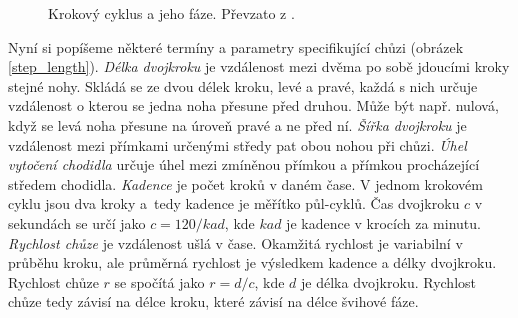 \begin{figure}[h]
\begin{center}
\caption{Krokový cyklus a jeho fáze. Převzato z \cite{gait_img}.} \label{gait_cycle}
\end{center}
\end{figure}

Nyní si popíšeme některé termíny a parametry specifikující chůzi (obrázek \ref{step_length}). \textit{Délka dvojkroku} je vzdálenost mezi dvěma po sobě jdoucími kroky stejné nohy. Skládá se ze dvou délek kroku, levé a pravé, každá s nich určuje vzdálenost o kterou se jedna noha přesune před druhou. Může být např. nulová, když se levá noha přesune na úroveň pravé a ne před ní. \textit{Šířka dvojkroku} je vzdálenost mezi přímkami určenými středy pat obou nohou při chůzi. \textit{Úhel vytočení chodidla} určuje úhel mezi zmíněnou přímkou a přímkou procházející středem chodidla. \textit{Kadence} je počet kroků v daném čase. V jednom krokovém cyklu jsou dva kroky a~tedy kadence je měřítko půl-cyklů. Čas dvojkroku $c$ v sekundách se určí jako $c = 120/kad$, kde $kad$ je kadence v krocích za minutu. \textit{Rychlost chůze} je vzdálenost ušlá v čase. Okamžitá rychlost je variabilní v průběhu kroku, ale průměrná rychlost je výsledkem kadence a délky dvojkroku. Rychlost chůze $r$ se spočítá jako $r = d/c$, kde $d$ je délka dvojkroku. Rychlost chůze tedy závisí na délce kroku, které závisí na délce švihové fáze.

